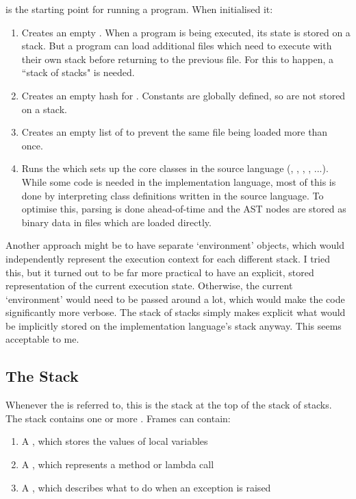  is the starting point for running a program. When initialised it:

\begin{enumerate}
  \item Creates an empty . When a program is being executed, its state is stored on a stack. But a program can load additional files which need to execute with their own stack before returning to the previous file. For this to happen, a ``stack of stacks" is needed.
  \item Creates an empty hash for . Constants are globally defined, so are not stored on a stack.
  \item Creates an empty list of  to prevent the same file being loaded more than once.
  \item Runs the  which sets up the core classes in the source language (, , , , ...). While some code is needed in the implementation language, most of this is done by interpreting class definitions written in the source language. To optimise this, parsing is done ahead-of-time and the AST nodes are stored as binary data in files which are loaded directly.
\end{enumerate}

Another approach might be to have separate `environment' objects, which would independently represent the execution context for each different stack. I tried this, but it turned out to be far more practical to have an explicit, stored representation of the current execution state. Otherwise, the current `environment' would need to be passed around a lot, which would make the code significantly more verbose. The stack of stacks simply makes explicit what would be implicitly stored on the implementation language's stack anyway. This seems acceptable to me.

\subsection{The Stack}

Whenever the  is referred to, this is the stack at the top of the stack of stacks. The stack contains one or more . Frames can contain:

\begin{enumerate}
  \item A , which stores the values of local variables
  \item A , which represents a method or lambda call
  \item A , which describes what to do when an exception is raised
\end{enumerate}

